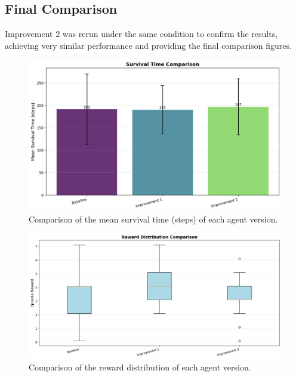 \documentclass[twocolumn]{article}
\begin{document}
\subsection*{Final Comparison}
Improvement 2 was rerun under the same condition to confirm the results, achieving very similar performance and providing the final comparison figures.

\begin{figure}[H]
	\centering
	\includegraphics[width=0.8\linewidth]{images/DQNImprov2survival_comparison.png}
	\caption{Comparison of the mean survival time (steps) of each agent version.}
	\label{fig:dqn_comp_survival}
\end{figure}
\begin{figure}[H]
	\centering
	\includegraphics[width=0.8\linewidth]{images/DQNImprov2reward_comparison.png}
	\caption{Comparison of the reward distribution of each agent version.}
	\label{fig:dqn_comp_reward}
\end{figure}
\end{document}
